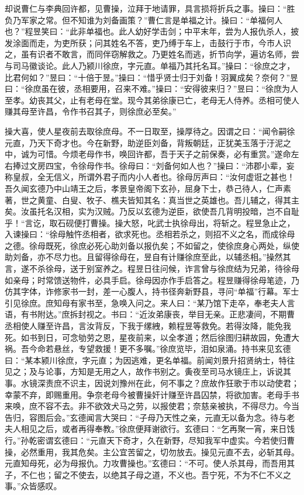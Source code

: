 却说曹仁与李典回许都，见曹操，泣拜于地请罪，具言损将折兵之事。操曰：“胜负乃军家之常。但不知谁为刘备画策？”曹仁言是单福之计。操曰：“单福何人也？”程昱笑曰：“此非单福也。此人幼好学击剑；中平末年，尝为人报仇杀人，披发涂面而走，为吏所获；问其姓名不答，吏乃缚于车上，击鼓行于市，今市人识之，虽有识者不敢言，而同伴窃解救之。乃更姓名而逃，折节向学，遍访名师，尝与司马徽谈论。此人乃颍川徐庶，字元直。单福乃其托名耳。”操曰：“徐庶之才，比君何如？”昱曰：“十倍于昱。”操曰：“惜乎贤士归于刘备！羽翼成矣？奈何？”昱曰：“徐庶虽在彼，丞相要用，召来不难。”操曰：“安得彼来归？”昱曰：“徐庶为人至孝。幼丧其父，止有老母在堂。现今其弟徐康已亡，老母无人侍养。丞相可使人赚其母至许昌，令作书召其子，则徐庶必至矣。”

操大喜，使人星夜前去取徐庶母。不一日取至，操厚待之。因谓之曰：“闻令嗣徐元直，乃天下奇才也。今在新野，助逆臣刘备，背叛朝廷，正犹美玉落于汙泥之中，诚为可惜。今烦老母作书，唤回许都，吾于天子之前保奏，必有重赏。”遂命左右捧过文房四宝，令徐母作书。徐母曰：“刘备何如人也？”操曰：“沛郡小辈，妄称皇叔，全无信义，所谓外君子而内小人者也。徐母厉声曰：“汝何虚诳之甚也！吾久闻玄德乃中山靖王之后，孝景皇帝阁下玄孙，屈身下士，恭己待人，仁声素著，世之黄童、白叟、牧子、樵夫皆知其名：真当世之英雄也。吾儿辅之，得其主矣。汝虽托名汉相，实为汉贼。乃反以玄德为逆臣，欲使吾几背明投暗，岂不自耻乎！“言讫，取石砚便打曹操。操大怒，叱武士执徐母出，将斩之。程昱急止之，入谏操曰：“徐母触忤丞相者，欲求死也。丞相若杀之，则招不义之名，而成徐母之德。徐母既死，徐庶必死心助刘备以报仇矣；不如留之，使徐庶身心两处，纵使助刘备，亦不尽力也。且留得徐母在，昱自有计赚徐庶至此，以辅丞相。”操然其言，遂不杀徐母，送于别室养之。程昱日往问候，诈言曾与徐庶结为兄弟，待徐母如亲母；时常馈送物件，必具手启。徐母因亦作手启答之。程昱赚得徐母笔迹，乃仿其字体，诈修家书一封，差一心腹人，持书径奔新野县，寻问“单福”行幕。军士引见徐庶。庶知母有家书至，急唤入问之。来人曰：“某乃馆下走卒，奉老夫人言语，有书附达。”庶拆封视之。书曰：“近汝弟康丧，举目无亲。正悲凄间，不期曹丞相使人赚至许昌，言汝背反，下我于缧絏，赖程昱等救免。若得汝降，能免我死。如书到日，可念劬劳之恩，星夜前来，以全孝道；然后徐图归耕故园，免遭大祸。吾今命若悬丝，专望救援！更不多嘱。”徐庶览毕，泪如泉涌。持书来见玄德曰：“某本颍川徐庶，字元直；为因逃难，更名单福。前闻刘景升招贤纳士，特往见之；及与论事，方知是无用之人，故作书别之。夤夜至司马水镜庄上，诉说其事。水镜深责庶不识主，因说刘豫州在此，何不事之？庶故作狂歌于市以动使君；幸蒙不弃，即赐重用。争奈老母今被曹操奸计赚至许昌囚禁，将欲加害。老母手书来唤，庶不容不去。非不欲效犬马之劳，以报使君；奈慈亲被执，不得尽力。今当告归，容图后会。”玄德闻言大哭曰：“子母乃天性之亲，元直无以备为念。待与老夫人相见之后，或者再得奉教。”徐庶便拜谢欲行。玄德曰：“乞再聚一宵，来日饯行。”孙乾密谓玄德曰：“元直天下奇才，久在新野，尽知我军中虚实。今若使归曹操，必然重用，我其危矣。主公宜苦留之，切勿放去。操见元直不去，必斩其母。元直知母死，必为母报仇。力攻曹操也。”玄德曰：“不可。使人杀其母，而吾用其子，不仁也；留之不使去，以绝其子母之道，不义也。吾宁死，不为不仁不义之事。”众皆感叹。


